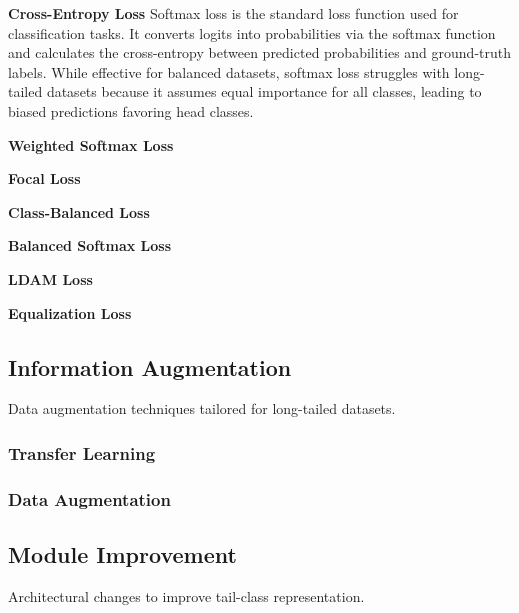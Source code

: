 \myindent \textbf{Cross-Entropy Loss}
Softmax loss is the standard loss function used for classification tasks. It converts logits into probabilities via the softmax function and calculates the cross-entropy between predicted probabilities and ground-truth labels. While effective for balanced datasets, softmax loss struggles with long-tailed datasets because it assumes equal importance for all classes, leading to biased predictions favoring head classes.

\myindent \textbf{Weighted Softmax Loss}

\myindent \textbf{Focal Loss}

\myindent \textbf{Class-Balanced Loss}

\myindent \textbf{Balanced Softmax Loss}

\myindent \textbf{LDAM Loss}

\myindent \textbf{Equalization Loss}


\subsection{Information Augmentation}
Data augmentation techniques tailored for long-tailed datasets.

\subsubsection{Transfer Learning}

\subsubsection{Data Augmentation}



\subsection{Module Improvement}
Architectural changes to improve tail-class representation.
